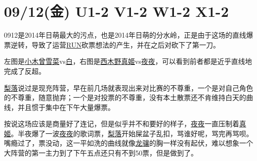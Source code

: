 \section{09/12(金) U1-2 V1-2 W1-2 X1-2}

0912是2014年日萌最大的污点，也是2014年日萌的分水岭，正是由于这场的直线爆票逆转，导致了运营\uline{RUN}砍票想法的产生，并在之后对砍下了第一刀。


左图是\uline{小木曾雪菜}vs\uline{白}，右图是\uline{西木野真姬}vs\uline{夜夜}，可以看到前者都是近乎直线地完成了反超。

\uline{梨落}说过是现充阵营，早在前几场就表现出来对比赛的不尊重，一个是对自己角色的不尊重，随意抛弃；一个是对投票的不尊重，没有本土散票还不肯维持白天的曲线，并且惯于集中在下午大量爆票。

按说这场应该是商量好了连记，但是似乎并不和要好的样子，\uline{夜夜}一直压制着\uline{真姬}。半夜爆了一波\uline{夜夜}的歌词票，\uline{梨落}开始屎盆子乱扣，骂谁好呢，骂完再骂呗。嘴瘾过了，票没动，这一平如洗的曲线就像\uline{龙骧}的胸一样没有起伏，难以想象一个大阵营的第一主力到了下午五点还只有不到50票，但是做到了。

